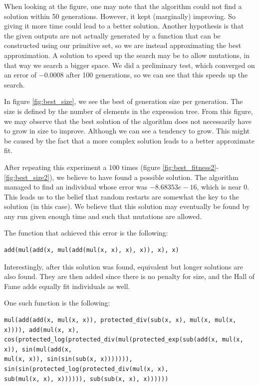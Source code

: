 \documentclass[11pt]{article}
\begin{document}
When looking at the figure, one may note that the algorithm could not find a solution within 50 generations. However, it kept (marginally) improving. So giving it more time could lead to a better solution. Another hypothesis is that the given outputs are not actually generated by a function that can be constructed using our primitive set, so we are instead approximating the best approximation. A solution to speed up the search may be to allow mutations, in that way we search a bigger space. We did a preliminary test, which converged on an error of $-0.0008$ after 100 generations, so we can see that this speeds up the search.

In figure \ref{fig:best_size}, we see the best of generation size per generation. The size is defined by the number of elements in the expression tree. From this figure, we may observe that the best solution of the algorithm does not necessarily have to grow in size to improve. Although we can see a tendency to grow. This might be caused by the fact that a more complex solution leads to a better approximate fit.

After repeating this experiment a 100 times (figure \ref{fig:best_fitness2}-\ref{fig:best_size2}), we believe to have found a possible solution. The algorithm managed to find an individual whose error was $-8.68353e-16$, which is near $0$. This leads us to the belief that random restarts are somewhat the key to the solution (in this case). We believe that this solution may eventually be found by any run given enough time and such that mutations are allowed.

The function that achieved this error is the following:

\begin{verbatim}
add(mul(add(x, mul(add(mul(x, x), x), x)), x), x)
\end{verbatim}

Interestingly, after this solution was found, equivalent but longer solutions are also found. They are then added since there is no penalty for size, and the Hall of Fame adds equally fit individuals as well. 

One such function is the following:

\begin{verbatim}
mul(add(add(x, mul(x, x)), protected_div(sub(x, x), mul(x, mul(x, x)))), add(mul(x, x),
cos(protected_log(protected_div(mul(protected_exp(sub(add(x, mul(x, x)), sin(mul(add(x, 
mul(x, x)), sin(sin(sub(x, x))))))), sin(sin(protected_log(protected_div(mul(x, x), 
sub(mul(x, x), x)))))), sub(sub(x, x), x))))))
\end{verbatim}
\end{document}
